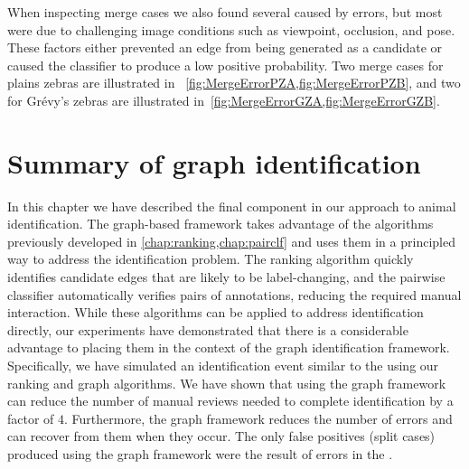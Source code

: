     When inspecting merge cases we also found several caused by \groundtruth{} errors, but most were due to
      challenging image conditions such as viewpoint, occlusion, and pose.
    These factors either prevented an edge from being generated as a candidate or caused the classifier to
      produce a low positive probability.
    Two merge cases for plains zebras are illustrated in ~\cref{fig:MergeErrorPZA,fig:MergeErrorPZB}, and two for
      Grévy's zebras are illustrated in~\cref{fig:MergeErrorGZA,fig:MergeErrorGZB}.


    \SplitErrorsPZ{}

    \SplitErrorsGZ{}

    \MergeErrorPZA{}

    \MergeErrorPZB{}

    \MergeErrorGZA{}

    \MergeErrorGZB{}

 
\FloatBarrier{}
\section{Summary of graph identification}\label{sec:graphconclusion}

In this chapter we have described the final component in our approach to animal identification.
The graph-based framework takes advantage of the algorithms previously developed in
  \cref{chap:ranking,chap:pairclf} and uses them in a principled way to address the identification problem.
The ranking algorithm quickly identifies candidate edges that are likely to be label-changing, and the pairwise
  classifier automatically verifies pairs of annotations, reducing the required manual interaction.
While these algorithms can be applied to address identification directly, our experiments have demonstrated that
  there is a considerable advantage to placing them in the context of the graph identification framework.
Specifically, we have simulated an identification event similar to the \GZC{} using our ranking and graph
  algorithms.
We have shown that using the graph framework can reduce the number of manual reviews needed to complete
  identification by a factor of $4$.
Furthermore, the graph framework reduces the number of errors and can recover from them when they occur.
The only false positives (split cases) produced using the graph framework were the result of errors in the
  \groundtruth{}.

